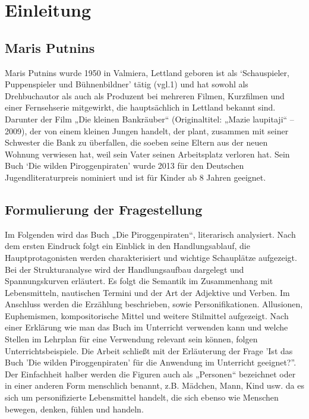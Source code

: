 \chapter{Einleitung}

\section{Maris Putnins}
Maris Putnins wurde 1950 in Valmiera, Lettland geboren ist als `Schauspieler, Puppenspieler und Bühnenbildner' 
tätig (vgl.1) und hat sowohl als Drehbuchautor als auch als Produzent bei mehreren Filmen, Kurzfilmen und einer 
Fernsehserie mitgewirkt, die hauptsächlich in Lettland bekannt  sind. \cite{jlib} Darunter der Film „Die kleinen Bankräuber“ \cite{imdb2}
(Originaltitel: „Mazie laupitaji“ – 2009), der von einem kleinen Jungen handelt, der plant, zusammen mit seiner 
Schwester die Bank zu überfallen, die soeben seine Eltern aus der neuen Wohnung verwiesen hat, weil sein Vater 
seinen Arbeitsplatz verloren hat. \cite{imdb}
Sein Buch `Die wilden Piroggenpiraten' wurde 2013 für den Deutschen Jugendliteraturpreis nominiert und ist für Kinder ab 8 Jahren geeignet. \cite{pir}

\section{Formulierung der Fragestellung}
Im Folgenden wird das Buch „Die Piroggenpiraten“, literarisch analysiert. Nach dem ersten Eindruck folgt ein
Einblick in den Handlungsablauf, die Hauptprotagonisten werden charakterisiert und wichtige Schauplätze aufgezeigt. 
Bei der Strukturanalyse wird der Handlungsaufbau dargelegt und Spannungskurven erläutert. 
Es folgt die Semantik im Zusammenhang mit Lebensmitteln, nautischen Termini und der Art der Adjektive und Verben. Im Anschluss werden die Erzählung beschrieben, sowie Personifikationen. Allusionen, Euphemismen, kompositorische Mittel und weitere Stilmittel aufgezeigt.
Nach einer Erklärung wie man das Buch im Unterricht verwenden kann und welche Stellen im Lehrplan für eine Verwendung relevant sein können, folgen Unterrichtsbeispiele. Die Arbeit schließt mit der Erläuterung der Frage 'Ist das Buch 'Die wilden Piroggenpiraten' für die Anwendung im Unterricht geeignet?''.
\\
Der Einfachheit halber werden die Figuren auch als „Personen“ bezeichnet oder in einer anderen 
Form menschlich benannt, z.B. Mädchen, Mann, Kind usw. da es sich um personifizierte Lebensmittel handelt, die sich ebenso wie Menschen bewegen, denken, fühlen und handeln. 

